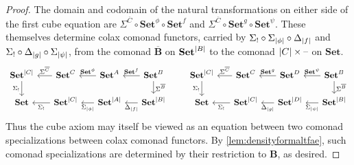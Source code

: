 \documentclass[11pt, oneside, article]{memoir}
\theoremstyle{plain}
\theoremstyle{definition}
\theoremstyle{remark}
\DeclarePairedDelimiter{\abs}{\lvert}{\rvert}
\newcommand{\dash}{{\mathord{\text{--}}}}
\newcommand{\bang}{\mathrm{!}}
\newcommand{\namedcat}[1]{\mathbf{#1}}
\newcommand{\cat}[1]{\mathbf{#1}}
\newcommand{\Set}{\namedcat{Set}}
\newcommand{\CoalgOn}[2]{{#2}^{#1}}
\newcommand{\CoalgSet}[1]{\CoalgOn{#1}{\Set}}
\newcommand{\clift}[1]{\overline{#1}}
\newcommand{\pts}[1]{{\abs{#1}}}
\newcommand{\one}[1]{\pts{#1}}
\newcommand{\carr}{\Sigma}
\newcommand{\leindex}[1]{\Sigma_{#1}}
\newcommand{\reindex}[1]{\Delta_{#1}}
\newcommand{\slicel}{\Sigma_\bang}
\newcommand{\car}[1]{\carr^{#1}}
\newcommand{\com}[2]{{#1}^{#2}}
\newcommand{\con}[2]{{#1}^{#2}}
\newcommand{\cmnd}[1]{{#1}}
\newcommand{\cA}{\cmnd{A}}
\newcommand{\cB}{\cmnd{B}}
\newcommand{\cC}{\cmnd{C}}
\newcommand{\cD}{\cmnd{D}}
\newcommand{\bB}{\cat{B}}
\newcommand{\ASet}{\CoalgSet{\cA}}
\newcommand{\BSet}{\CoalgSet{\cB}}
\newcommand{\CSet}{\CoalgSet{\cC}}
\newcommand{\DSet}{\CoalgSet{\cD}}
\newcommand{\SetpA}{\Set^\pts{\cA}}
\newcommand{\SetpB}{\Set^\pts{\cB}}
\newcommand{\SetpC}{\Set^\pts{\cC}}
\newcommand{\SetpD}{\Set^\pts{\cD}}
\begin{document}
\begin{proof}
  The domain and codomain of the natural
  transformations on either side of the first cube equation are
  $\car{\clift{\cC}} \circ \com{\Set}{\phi} \circ \con{\Set}{f}$ and
  $\car{\clift{\cC}} \circ \con{\Set}{g} \circ \com{\Set}{\psi}$. These
  themselves determine colax comonad functors, carried by
  $\slicel \circ \leindex{\one{\phi}} \circ \reindex{\one{f}}$ and
  $\slicel \circ \reindex{\one{g}} \circ \leindex{\one{\psi}}$, from the
  comonad $\clift{\bB}$ on $\SetpB$ to the comonad
  $\pts{\cC} \times \dash$ on $\Set$.
  \[
    \begin{tikzcd}[column sep=15, row sep=15]
      \SetpC & \CSet & \ASet & \BSet \\
      \Set  & \SetpC & \SetpA & \SetpB
      \arrow["{\slicel}"', from=1-1, to=2-1]
      \arrow["\car{\clift{\cB}}", from=1-4, to=2-4]
      \arrow["\car{\clift{\cC}}"', from=1-2, to=1-1]
      \arrow["{\com{\Set}{\phi}}"', from=1-3, to=1-2]
      \arrow["{\con{\Set}{f}}"', from=1-4, to=1-3]
      \arrow["{\slicel}", from=2-2, to=2-1]
      \arrow["{\leindex{\one{\phi}}}", from=2-3, to=2-2]
      \arrow["{\reindex{\one{f}}}", from=2-4, to=2-3]
    \end{tikzcd}
    \qquad
    \begin{tikzcd}[column sep=15, row sep=15]
      \SetpC & \CSet & \DSet & \BSet \\
      \Set  & \SetpC & \SetpD & \SetpB
      \arrow["{\slicel}"', from=1-1, to=2-1]
      \arrow["{\car{\clift{\cB}}}", from=1-4, to=2-4]
      \arrow["\car{\clift{\cC}}"', from=1-2, to=1-1]
      \arrow["{\con{\Set}{g}}"', from=1-3, to=1-2]
      \arrow["{\com{\Set}{\psi}}"', from=1-4, to=1-3]
      \arrow["{\slicel}", from=2-2, to=2-1]
      \arrow["{\reindex{\one{g}}}", from=2-3, to=2-2]
      \arrow["{\leindex{\one{\psi}}}", from=2-4, to=2-3]
    \end{tikzcd}
  \]
  Thus the cube axiom may itself be viewed as an equation between two
  comonad specializations between colax comonad functors.  By
  \cref{lem:densityformaltfae}, such comonad specializations are
  determined by their restriction to $\bB$, as desired.
\end{proof}
\end{document}
